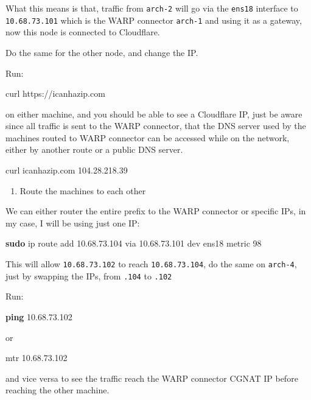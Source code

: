 \documentclass[
]{article}
\newenvironment{Shaded}{\begin{snugshade}}{\end{snugshade}}
\newcommand{\ExtensionTok}[1]{#1}
\newcommand{\FunctionTok}[1]{\textcolor[rgb]{0.13,0.29,0.53}{\textbf{#1}}}
\newcommand{\NormalTok}[1]{#1}
\providecommand{\tightlist}{%
  \setlength{\itemsep}{0pt}\setlength{\parskip}{0pt}}\usepackage{longtable,booktabs,array}
\begin{document}
What this means is that, traffic from \texttt{arch-2} will go via the
\texttt{ens18} interface to \texttt{10.68.73.101} which is the WARP
connector \texttt{arch-1} and using it as a gateway, now this node is
connected to Cloudflare.

Do the same for the other node, and change the IP.

Run:

\begin{Shaded}
\begin{Highlighting}[numbers=left,,]
\ExtensionTok{curl}\NormalTok{ https://icanhazip.com}
\end{Highlighting}
\end{Shaded}

on either machine, and you should be able to see a Cloudflare IP, just
be aware since all traffic is sent to the WARP connector, that the DNS
server used by the machines routed to WARP connector can be accessed
while on the network, either by another route or a public DNS server.

\begin{Shaded}
\begin{Highlighting}[numbers=left,,]
\ExtensionTok{curl}\NormalTok{ icanhazip.com                                                              }
\ExtensionTok{104.28.218.39}
\end{Highlighting}
\end{Shaded}

\begin{enumerate}
\def\labelenumi{\arabic{enumi}.}
\setcounter{enumi}{6}
\tightlist
\item
  Route the machines to each other
\end{enumerate}

We can either router the entire prefix to the WARP connector or specific
IPs, in my case, I will be using just one IP:

\begin{Shaded}
\begin{Highlighting}[numbers=left,,]
\FunctionTok{sudo}\NormalTok{ ip route add 10.68.73.104 via 10.68.73.101 dev ens18 metric 98}
\end{Highlighting}
\end{Shaded}

This will allow \texttt{10.68.73.102} to reach \texttt{10.68.73.104}, do
the same on \texttt{arch-4}, just by swapping the IPs, from
\texttt{.104} to \texttt{.102}

Run:

\begin{Shaded}
\begin{Highlighting}[numbers=left,,]
\FunctionTok{ping}\NormalTok{ 10.68.73.102}
\end{Highlighting}
\end{Shaded}

or

\begin{Shaded}
\begin{Highlighting}[numbers=left,,]
\ExtensionTok{mtr}\NormalTok{ 10.68.73.102}
\end{Highlighting}
\end{Shaded}

and vice versa to see the traffic reach the WARP connector CGNAT IP
before reaching the other machine.
\end{document}
